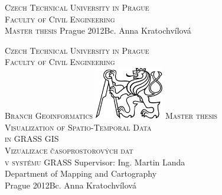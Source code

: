 \begin{center}
\newcommand{\napisCVUT}{Czech Technical University in Prague}
\newcommand{\napisFS}{Faculty of Civil Engineering}
\newcommand{\napisObor}{Branch Geoinformatics}
\newcommand{\napisKatedra}{Department of Mapping and Cartography}
\newcommand{\napisVedouci}{Ing. Martin Landa}
\newcommand{\napisAutor}{Bc. Anna Kratochvílová}
\newcommand{\napisNazevI}{Visualization of Spatio-Temporal Data}
\newcommand{\napisNazevII}{in GRASS GIS}
\newcommand{\napisNazevAJI}{Vizualizace časoprostorových dat}
\newcommand{\napisNazevAJII}{v systému GRASS}
\newcommand{\napisBakalarka}{Master thesis}
\newcommand{\napisPraha}{Prague 2012}
\newcommand{\napisDatum}{Prague 2012}
%
\newcommand{\velka}[1]{\textsc{#1}}
%
%
\newif\ifpatitul
\patitultrue


\ifpatitul
{\Large\velka{\napisCVUT}}\\
\velka{\Large\napisFS}\\
\vfill
{\LARGE\velka{\napisBakalarka}}
\vfill
{\large\napisPraha\hfill\napisAutor}
\newpage
\fi%

\cleardoublepage

{\Large\velka{\napisCVUT}}\\
{\Large\velka{\napisFS}}\\
{\Large\velka{\napisObor}}
\vfill
\includegraphics[width=3cm]{logo_cvut_black} %
\vfill
{\Large\velka{\napisBakalarka}}\\
{\Large\velka{\napisNazevI\\
\napisNazevII}}
{\\\bigskip\large\velka{\napisNazevAJI\\
\napisNazevAJII}}
\vfill
{\large%
Supervisor: \napisVedouci\\
\napisKatedra\\
\bigskip
\napisDatum\hfill\napisAutor}
\end{center}
